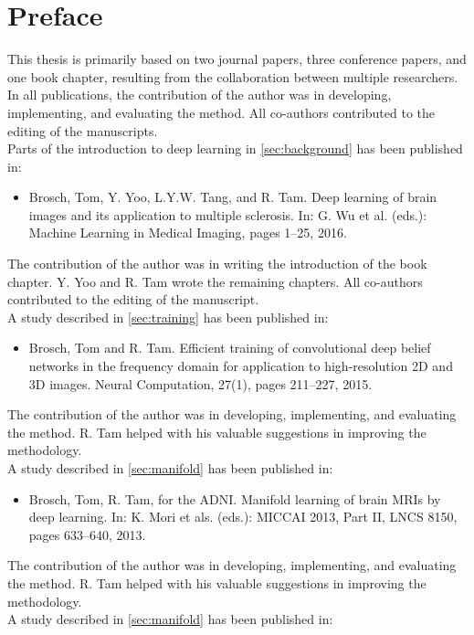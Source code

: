 \chapter*{Preface}

This thesis is primarily based on two journal papers, three conference
papers, and one book chapter, resulting from the collaboration between multiple
researchers. In all publications, the contribution of the author was in
developing, implementing, and evaluating the method. All co-authors
contributed to the editing of the manuscripts.
\\[1em]
Parts of the introduction to deep learning in \ref{sec:background} has been
published in:
\begin{itemize}
\item Brosch, Tom, Y. Yoo, L.Y.W. Tang, and R. Tam.
Deep learning of brain images and its application to multiple sclerosis.
In: G. Wu et al. (eds.): Machine Learning in Medical Imaging, pages 1--25,
2016.
\end{itemize}
The contribution of the author was in writing the introduction of the book
chapter. Y. Yoo and R. Tam wrote the remaining chapters. All co-authors
contributed to the editing of the manuscript.
\\[1em]
A study described in \ref{sec:training} has been published in:
\begin{itemize}
\item Brosch, Tom and R. Tam. Efficient training of convolutional deep
belief networks in the frequency domain for application to high-resolution 2D
and 3D images. Neural Computation, 27(1), pages 211--227, 2015.
\end{itemize}
The contribution of the author was in developing, implementing, and evaluating
the method. R. Tam helped with his valuable suggestions in improving the
methodology.
\\[1em]
A study described in \ref{sec:manifold} has been published in:
\begin{itemize}
\item Brosch, Tom, R. Tam, for the ADNI. Manifold learning of brain MRIs
by deep learning. In: K. Mori et als. (eds.): MICCAI 2013, Part II, LNCS 8150,
pages 633--640, 2013.
\end{itemize}
The contribution of the author was in developing, implementing, and evaluating
the method. R. Tam helped with his valuable suggestions in improving the
methodology.
\\[1em]
A study described in \ref{sec:manifold} has been published in:
